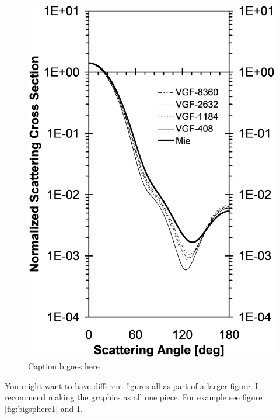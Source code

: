 \begin{figure}[!htb]
\begin{minipage}{0.5\textwidth}
		\includegraphics[width=0.9\linewidth, height=0.35\textheight]{test70}
		\caption{Caption b goes here}
		\label{fig:bigsphere2}
	\end{minipage}
\end{figure}
You might want to have different figures all as part of a larger figure. I recommend making the graphics as all one piece.  For example see figure \ref{fig:bigsphere1} and \ref{fig:bigsphere2}.
